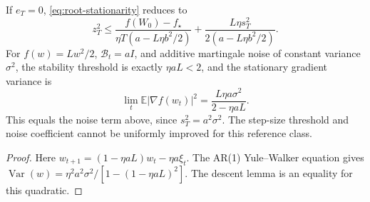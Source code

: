 \begin{corollary}
If $e_T=0$, \eqref{eq:root-stationarity} reduces to
\begin{equation}
 z_T^2\le\frac{f(W_0)-f_\star}{\eta T(a-L\eta b^2/2)}
                   +\frac{L\eta s_T^2}{2(a-L\eta b^2/2)}.
\end{equation}
For $f(w)=Lw^2/2$, $\mathcal B_t=aI$, and additive martingale noise of
constant variance $\sigma^2$, the stability threshold is exactly
$\eta aL<2$, and the stationary gradient variance is
\begin{equation}
 \lim_t\mathbb E|\nabla f(w_t)|^2
       =\frac{L\eta a\sigma^2}{2-\eta aL}.
\end{equation}
This equals the noise term above, since $s_T^2=a^2\sigma^2$.
The step-size threshold and noise coefficient cannot be uniformly improved
for this reference class.
\end{corollary}
\begin{proof}
Here $w_{t+1}=(1-\eta aL)w_t-\eta a\xi_t$.
The AR(1) Yule--Walker equation \cite{brockwell1991time} gives
$\operatorname{Var}(w)=\eta^2a^2\sigma^2/[1-(1-\eta aL)^2]$.
The descent lemma is an equality for this quadratic.
\end{proof}
